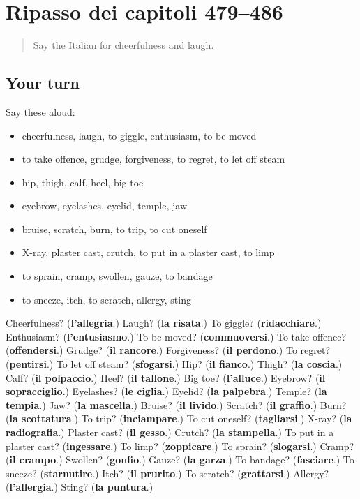 \section[(dialogue)]{Ripasso dei capitoli 479–486}

\label{lesson:IT-R486-ripasso-479-486}



\begin{quote}
Say the Italian for cheerfulness and laugh.
\end{quote}

\subsection*{Your turn}
Say these aloud:

\begin{itemize}
\raggedright
  \item cheerfulness, laugh, to giggle, enthusiasm, to be moved
  \item to take offence, grudge, forgiveness, to regret, to let off steam
  \item hip, thigh, calf, heel, big toe
  \item eyebrow, eyelashes, eyelid, temple, jaw
  \item bruise, scratch, burn, to trip, to cut oneself
  \item X-ray, plaster cast, crutch, to put in a plaster cast, to limp
  \item to sprain, cramp, swollen, gauze, to bandage
  \item to sneeze, itch, to scratch, allergy, sting
\end{itemize}

\begin{tcolorbox}[breakable,colback=teal!4,colframe=teal!35!black,title={Before you move on}]
Cheerfulness? (\textbf{l'allegria}.) Laugh? (\textbf{la risata}.) To giggle? (\textbf{ridacchiare}.) Enthusiasm? (\textbf{l'entusiasmo}.) To be moved? (\textbf{commuoversi}.) To take offence? (\textbf{offendersi}.) Grudge? (\textbf{il rancore}.) Forgiveness? (\textbf{il perdono}.) To regret? (\textbf{pentirsi}.) To let off steam? (\textbf{sfogarsi}.) Hip? (\textbf{il fianco}.) Thigh? (\textbf{la coscia}.) Calf? (\textbf{il polpaccio}.) Heel? (\textbf{il tallone}.) Big toe? (\textbf{l'alluce}.) Eyebrow? (\textbf{il sopracciglio}.) Eyelashes? (\textbf{le ciglia}.) Eyelid? (\textbf{la palpebra}.) Temple? (\textbf{la tempia}.) Jaw? (\textbf{la mascella}.) Bruise? (\textbf{il livido}.) Scratch? (\textbf{il graffio}.) Burn? (\textbf{la scottatura}.) To trip? (\textbf{inciampare}.) To cut oneself? (\textbf{tagliarsi}.) X-ray? (\textbf{la radiografia}.) Plaster cast? (\textbf{il gesso}.) Crutch? (\textbf{la stampella}.) To put in a plaster cast? (\textbf{ingessare}.) To limp? (\textbf{zoppicare}.) To sprain? (\textbf{slogarsi}.) Cramp? (\textbf{il crampo}.) Swollen? (\textbf{gonfio}.) Gauze? (\textbf{la garza}.) To bandage? (\textbf{fasciare}.) To sneeze? (\textbf{starnutire}.) Itch? (\textbf{il prurito}.) To scratch? (\textbf{grattarsi}.) Allergy? (\textbf{l'allergia}.) Sting? (\textbf{la puntura}.)
\end{tcolorbox}
